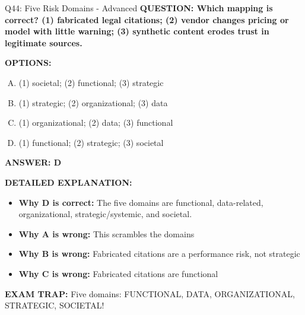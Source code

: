 \documentclass[8pt]{beamer}
\begin{document}
\begin{frame}[shrink=6]{Q44: Five Risk Domains - Advanced}
\fontsize{6.5}{7.5}\selectfont
\textbf{QUESTION: Which mapping is correct? (1) fabricated legal citations; (2) vendor changes pricing or model with little warning; (3) synthetic content erodes trust in legitimate sources.}

\vspace{0.1cm}
\textbf{OPTIONS:}
\begin{enumerate}[A.]
\item (1) societal; (2) functional; (3) strategic
\item (1) strategic; (2) organizational; (3) data
\item (1) organizational; (2) data; (3) functional
\item (1) functional; (2) strategic; (3) societal
\end{enumerate}

\vspace{0.1cm}
\textcolor{myblue}{\textbf{ANSWER: D}}

\vspace{0.1cm}
\textbf{DETAILED EXPLANATION:}
\begin{itemize}
\item \textbf{Why D is correct:} The five domains are functional, data-related, organizational, strategic/systemic, and societal.
\item \textbf{Why A is wrong:} This scrambles the domains
\item \textbf{Why B is wrong:} Fabricated citations are a performance risk, not strategic
\item \textbf{Why C is wrong:} Fabricated citations are functional
\end{itemize}

\textcolor{myred}{\textbf{EXAM TRAP:}} Five domains: FUNCTIONAL, DATA, ORGANIZATIONAL, STRATEGIC, SOCIETAL!
\end{frame}
\end{document}
